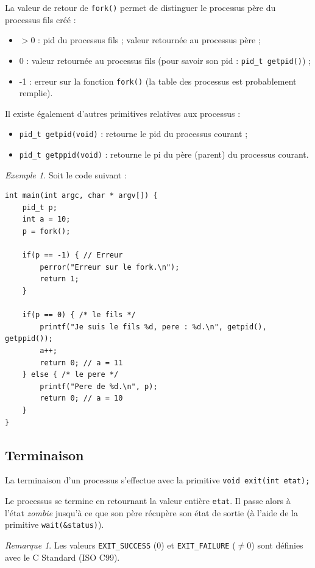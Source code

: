 \documentclass[11pt,english,french]{scrreprt}
\theoremstyle{remark}
\newtheorem*{rem*}{Remarque}
\newtheorem*{ex*}{Exemple}
\theoremstyle{definition}
\begin{document}
La valeur de retour de \lstinline!fork()! permet de distinguer le processus père du processus fils créé : \begin{itemize}
	\item $>0$ : pid du processus fils ; valeur retournée au processus père ;
	\item 0 : valeur retournée au processus fils (pour savoir son pid : \lstinline!pid_t getpid()!) ;
	\item -1 : erreur sur la fonction \lstinline!fork()! (la table des processus est probablement remplie).
\end{itemize}

Il existe également d'autres primitives relatives aux processus :\begin{itemize}
	\item \lstinline!pid_t getpid(void)! : retourne le pid du processus courant ;
	\item \lstinline!pid_t getppid(void)! : retourne le pi du père (parent) du processus courant.
\end{itemize}

\begin{ex*}
	Soit le code suivant :
\begin{lstlisting}
int main(int argc, char * argv[]) {
	pid_t p;
	int a = 10;
	p = fork();
	
	if(p == -1) { // Erreur
		perror("Erreur sur le fork.\n");
		return 1;
	}
	
	if(p == 0) { /* le fils */
		printf("Je suis le fils %d, pere : %d.\n", getpid(), getppid());
		a++;
		return 0; // a = 11
	} else { /* le pere */
		printf("Pere de %d.\n", p);
		return 0; // a = 10
	}
}
\end{lstlisting}	
\end{ex*}

\subsection{Terminaison} %

La terminaison d'un processus s'effectue avec la primitive \lstinline!void exit(int etat);!

Le processus se termine en retournant la valeur entière \lstinline!etat!. Il passe alors à l'état \emph{zombie} jusqu'à ce que son père récupère son état de sortie (à l'aide de la primitive \lstinline!wait(&status)!).

\begin{rem*}
	Les valeurs \lstinline!EXIT_SUCCESS! (0) et \lstinline!EXIT_FAILURE! ($\neq 0$) sont définies avec le C Standard (ISO C99).
\end{rem*}
\end{document}
